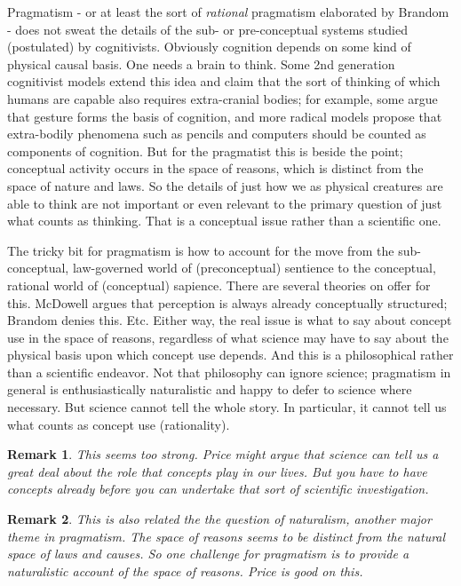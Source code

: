 \documentclass[11pt,twoside]{article}
\newtheorem{remark}{Remark}
\begin{document}
Pragmatism - or at least the sort of \textit{rational} pragmatism
elaborated by Brandom - does not sweat the details of the sub- or
pre-conceptual systems studied (postulated) by cognitivists.
Obviously cognition depends on some kind of physical causal basis.
One needs a brain to think.  Some 2nd generation cognitivist models
extend this idea and claim that the sort of thinking of which humans
are capable also requires extra-cranial bodies; for example, some
argue that gesture forms the basis of cognition, and more radical
models propose that extra-bodily phenomena such as pencils and
computers should be counted as components of cognition.  But for the
pragmatist this is beside the point; conceptual activity occurs in the
space of reasons, which is distinct from the space of nature and laws.
So the details of just how we as physical creatures are able to think
are not important or even relevant to the primary question of just
what counts as thinking.  That is a conceptual issue rather than a
scientific one.

The tricky bit for pragmatism is how to account for the move from the
sub-conceptual, law-governed world of (preconceptual) sentience to the
conceptual, rational world of (conceptual) sapience.  There are
several theories on offer for this.  McDowell argues that perception
is always already conceptually structured; Brandom denies this.  Etc.
Either way, the real issue is what to say about concept use in the
space of reasons, regardless of what science may have to say about the
physical basis upon which concept use depends.  And this is a
philosophical rather than a scientific endeavor.  Not that philosophy
can ignore science; pragmatism in general is enthusiastically
naturalistic and happy to defer to science where necessary.  But
science cannot tell the whole story.  In particular, it cannot tell us
what counts as concept use (rationality).

\begin{remark}
This seems too strong.  Price might argue that science can tell us a
great deal about the role that concepts play in our lives.  But you
have to have concepts already before you can undertake that sort of
scientific investigation.
\end{remark}

\begin{remark}
  This is also related the the question of naturalism, another major
  theme in pragmatism.  The space of reasons seems to be distinct from
  the natural space of laws and causes.  So one challenge for
  pragmatism is to provide a naturalistic account of the space of
  reasons.  Price is good on this.
\end{remark}
\end{document}
